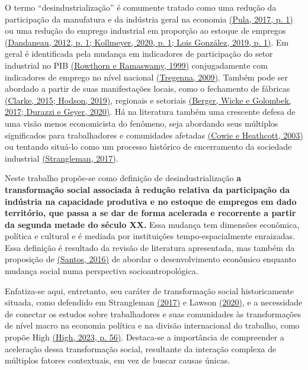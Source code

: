 O termo ``desindustrialização'' é comumente tratado como uma redução da
participação da manufatura e da indústria geral na economia
\href{https://www.zotero.org/google-docs/?SncwXs}{(Pula, 2017, p. 1)} ou
uma redução do emprego industrial em proporção ao estoque de empregos
\href{https://www.zotero.org/google-docs/?2eElZ8}{(Dandaneau, 2012, p.
1; Kollmeyer, 2020, p. 1; Lois González, 2019, p. 1)}. Em geral é
identificada pela mudança em indicadores de participação do setor
industrial no PIB
\href{https://www.zotero.org/google-docs/?UzkEfu}{(Rowthorn e Ramaswamy,
1999)} conjugadamente com indicadores de emprego no nível nacional
\href{https://www.zotero.org/google-docs/?L8IQDX}{(Tregenna, 2009)}.
Também pode ser abordado a partir de suas manifestações locais, como o
fechamento de fábricas
\href{https://www.zotero.org/google-docs/?8ZlqZh}{(Clarke, 2015; Hodson,
2019)}, regionais e setoriais
\href{https://www.zotero.org/google-docs/?hcZ5qK}{(Berger, Wicke e
Golombek, 2017; Durazzi e Geyer, 2020)}. Há na literatura também uma
crescente defesa de uma visão menos economicista do fenômeno, seja
abordando seus múltiplos significados para trabalhadores e comunidades
afetadas \href{https://www.zotero.org/google-docs/?XtB5a1}{(Cowie e
Heathcott, 2003)} ou tentando situá-lo como um processo histórico de
encerramento da sociedade industrial
\href{https://www.zotero.org/google-docs/?eZL9b3}{(Strangleman, 2017)}.

Neste trabalho propõe-se como definição de desindustrialização \textbf{a
transformação social associada à redução relativa da participação da
indústria na capacidade produtiva e no estoque de empregos em dado
território, que passa a se dar de forma acelerada e recorrente a partir
da segunda metade do século XX.} Essa mudança tem dimensões econômica,
política e cultural e é mediada por instituições tempo-espacialmente
enraizadas. Essa definição é resultado da revisão de literatura
apresentada, mas também da proposição de
\href{https://www.zotero.org/google-docs/?xdjSXH}{(Santos, 2016)} de
abordar o desenvolvimento econômico enquanto mudança social numa
perspectiva socioantropológica.

Enfatiza-se aqui, entretanto, seu caráter de transformação social
historicamente situada, como defendido em Strangleman
\href{https://www.zotero.org/google-docs/?whFleA}{(2017)} e Lawson
\href{https://www.zotero.org/google-docs/?LTSpDH}{(2020)}, e a
necessidade de conectar os estudos sobre trabalhadores e suas
comunidades às transformações de nível macro na economia política e na
divisão internacional do trabalho, como propõe High
\href{https://www.zotero.org/google-docs/?n0gdvx}{(High, 2023, p. 56)}.
Destaca-se a importância de compreender a aceleração dessa transformação
social, resultante da interação complexa de múltiplos fatores
contextuais, em vez de buscar causas únicas.

